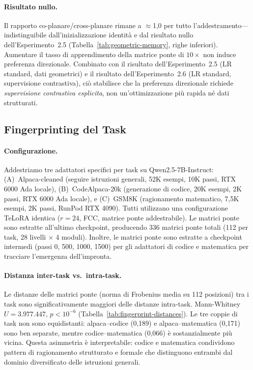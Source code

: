 \documentclass[11pt]{article}
\begin{document}
\paragraph{Risultato nullo.}
Il rapporto co-planare/cross-planare rimane a $\approx$1,0 per tutto
l'addestramento---indistinguibile dall'inizializzazione identit\`a e
dal risultato nullo dell'Esperimento~2.5
(Tabella~\ref{tab:geometric-memory}, righe inferiori).
Aumentare il tasso di apprendimento della matrice ponte di $10\times$
non induce preferenza direzionale. Combinato con il risultato
dell'Esperimento~2.5 (LR standard, dati geometrici) e il risultato
dell'Esperimento~2.6 (LR standard, supervisione contrastiva), ci\`o
stabilisce che la preferenza direzionale richiede \emph{supervisione
contrastiva esplicita}, non un'ottimizzazione pi\`u rapida n\'e dati
strutturati.

\subsection{Fingerprinting del Task}
\label{sec:exp-fingerprint}

\paragraph{Configurazione.}
Addestriamo tre adattatori specifici per task su Qwen2.5-7B-Instruct:
(A)~Alpaca-cleaned (seguire istruzioni generali, 52K esempi, 10K passi,
RTX 6000 Ada locale), (B)~CodeAlpaca-20k (generazione di codice, 20K
esempi, 2K passi, RTX 6000 Ada locale), e (C)~GSM8K (ragionamento
matematico, 7,5K esempi, 2K passi, RunPod RTX 4090). Tutti utilizzano
una configurazione TeLoRA identica ($r\!=\!24$, FCC, matrice ponte
addestrabile). Le matrici ponte sono estratte all'ultimo checkpoint,
producendo 336 matrici ponte totali (112 per task, 28 livelli
$\times$ 4 moduli). Inoltre, le matrici ponte sono estratte a
checkpoint intermedi (passi 0, 500, 1000, 1500) per gli adattatori di
codice e matematica per tracciare l'emergenza dell'impronta.

\paragraph{Distanza inter-task vs.\ intra-task.}
Le distanze delle matrici ponte (norma di Frobenius media su 112
posizioni) tra i task sono significativamente maggiori delle distanze
intra-task. Mann-Whitney $U = 3.977.447$, $p < 10^{-6}$
(Tabella~\ref{tab:fingerprint-distances}).
Le tre coppie di task non sono equidistanti: alpaca--codice (0,189) e
alpaca--matematica (0,171) sono ben separate, mentre codice--matematica
(0,066) \`e sostanzialmente pi\`u vicina. Questa asimmetria \`e
interpretabile: codice e matematica condividono pattern di ragionamento
strutturato e formale che distinguono entrambi dal dominio diversificato
delle istruzioni generali.
\end{document}
